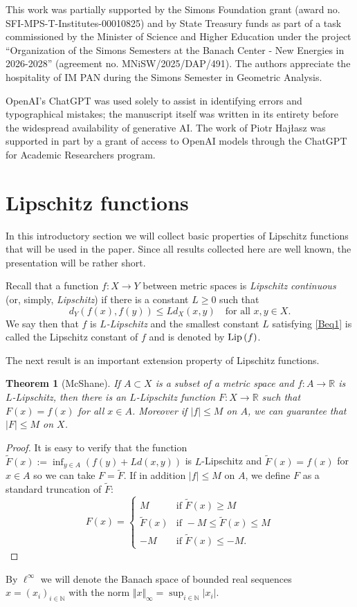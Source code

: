 \documentclass[12pt,leqno]{amsart}
\newtheorem{theorem}{Theorem}
\theoremstyle{definition}
\newcommand{\bbbn}{\mathbb N}
\newcommand{\bbbr}{\mathbb R}
\def\lip{{\rm Lip\,}}
\numberwithin{theorem}{section} \numberwithin{equation}{section}
\begin{document}
This work was partially supported by the Simons Foundation grant (award no. SFI-MPS-T-Institutes-00010825) and by State Treasury funds as part of a task commissioned by the Minister of Science and Higher Education under the project ``Organization of the Simons Semesters at the Banach Center - New Energies in 2026-2028'' (agreement no. MNiSW/2025/DAP/491). The authors appreciate the hospitality of IM PAN during the Simons Semester in Geometric Analysis.

OpenAI’s ChatGPT was used solely to assist in identifying errors and typographical mistakes; the manuscript itself was written in its entirety before the widespread availability of generative AI.
The work of Piotr Hajłasz was supported in part by a grant of access to OpenAI models through the ChatGPT for Academic Researchers program.
\section{Lipschitz functions}
\label{LF}
In this introductory section we will collect basic properties of Lipschitz functions that will be used in the paper. Since all results collected here are well known, the presentation will be rather short.

Recall that a function $f:X\to Y$ between metric spaces is {\em Lipschitz continuous} (or, simply, \emph{Lipschitz}) if there is a constant $L\geq 0$ such that
\begin{equation}
\label{Beq1}
d_Y(f(x),f(y))\leq Ld_X(x,y)
\quad
\text{for all } x,y\in X.
\end{equation}
We say then that $f$ is {\em $L$-Lipschitz} and the smallest constant $L$ satisfying \eqref{Beq1} is called the Lipschitz constant of $f$ and is denoted by $\lip(f)$.

The next result is an important extension property of Lipschitz functions.
\begin{theorem}[McShane]
\label{BT1}
If $A\subset X$ is a subset of a metric space and $f:A\to \bbbr$ is $L$-Lipschitz, then there is an $L$-Lipschitz function $F:X\to\bbbr$ such that $F(x)=f(x)$ for all $x\in A$.
Moreover if $|f|\leq M$ on $A$, we can guarantee that $|F|\leq M$ on $X$.
\end{theorem}
\begin{proof}
It is easy to verify that the function $\tilde{F}(x):=\inf_{y\in A}(f(y)+Ld(x,y))$ is $L$-Lipschitz and $\tilde{F}(x)=f(x)$ for $x\in A$ so we can take $F=\tilde{F}$. If in addition $|f|\leq M$ on $A$, we define $F$ as a standard truncation of $\tilde{F}$:
$$
F(x)=
\begin{cases}
M & \text{if } \tilde{F}(x)\geq M\\
\tilde{F}(x) & \text{if } -M\leq \tilde{F}(x)\leq M\\
-M & \text{if } \tilde{F}(x)\leq -M.
\end{cases}
$$
\end{proof}
By $\ell^\infty$ we will denote the Banach space of bounded real sequences $x=(x_i)_{i\in\bbbn}$ with the norm $\Vert x\Vert_\infty=\sup_{i\in\bbbn}|x_i|$.
\end{document}

